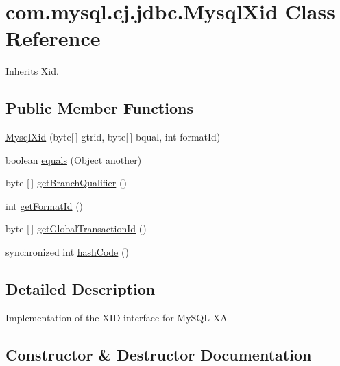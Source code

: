 \hypertarget{classcom_1_1mysql_1_1cj_1_1jdbc_1_1_mysql_xid}{}\section{com.\+mysql.\+cj.\+jdbc.\+Mysql\+Xid Class Reference}
\label{classcom_1_1mysql_1_1cj_1_1jdbc_1_1_mysql_xid}


Inherits Xid.

\subsection*{Public Member Functions}
\begin{DoxyCompactItemize}
\item 
\mbox{\hyperlink{classcom_1_1mysql_1_1cj_1_1jdbc_1_1_mysql_xid_a860578c3559c5dab35805d247d002b72}{Mysql\+Xid}} (byte\mbox{[}$\,$\mbox{]} gtrid, byte\mbox{[}$\,$\mbox{]} bqual, int format\+Id)
\item 
boolean \mbox{\hyperlink{classcom_1_1mysql_1_1cj_1_1jdbc_1_1_mysql_xid_a608b026cf00cb37d59c8843327268f58}{equals}} (Object another)
\item 
byte \mbox{[}$\,$\mbox{]} \mbox{\hyperlink{classcom_1_1mysql_1_1cj_1_1jdbc_1_1_mysql_xid_a0ba0046d36f1442f1bb00ce14fba1099}{get\+Branch\+Qualifier}} ()
\item 
int \mbox{\hyperlink{classcom_1_1mysql_1_1cj_1_1jdbc_1_1_mysql_xid_a5a4e84399551260bda9e63c03a0692ed}{get\+Format\+Id}} ()
\item 
byte \mbox{[}$\,$\mbox{]} \mbox{\hyperlink{classcom_1_1mysql_1_1cj_1_1jdbc_1_1_mysql_xid_a9946171dbb1d2769f3bb05297cd0fdbd}{get\+Global\+Transaction\+Id}} ()
\item 
synchronized int \mbox{\hyperlink{classcom_1_1mysql_1_1cj_1_1jdbc_1_1_mysql_xid_a9e4d859fda8a7556c024889bbf1e9b0f}{hash\+Code}} ()
\end{DoxyCompactItemize}


\subsection{Detailed Description}
Implementation of the X\+ID interface for My\+S\+QL XA 

\subsection{Constructor \& Destructor Documentation}
\mbox{\label{classcom_1_1mysql_1_1cj_1_1jdbc_1_1_mysql_xid_a860578c3559c5dab35805d247d002b72}} 
